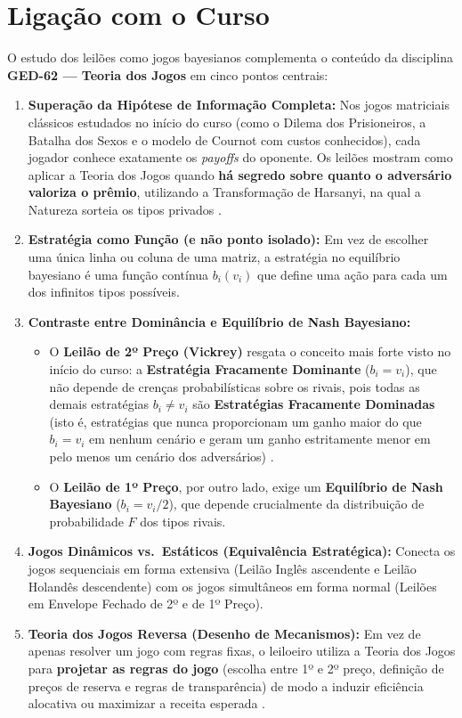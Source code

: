 \section{Ligação com o Curso}
\label{sec:ligacao_curso}

O estudo dos leilões como jogos bayesianos complementa o conteúdo da disciplina \textbf{GED-62 --- Teoria dos Jogos} em cinco pontos centrais:

\begin{enumerate}[label=\arabic*.]
    \item \textbf{Superação da Hipótese de Informação Completa:} Nos jogos matriciais clássicos estudados no início do curso (como o Dilema dos Prisioneiros, a Batalha dos Sexos e o modelo de Cournot com custos conhecidos), cada jogador conhece exatamente os \textit{payoffs} do oponente. Os leilões mostram como aplicar a Teoria dos Jogos quando \textbf{há segredo sobre quanto o adversário valoriza o prêmio}, utilizando a Transformação de Harsanyi, na qual a Natureza sorteia os tipos privados \cite{harsanyi1967,gibbons1992}.
    \item \textbf{Estratégia como Função (e não ponto isolado):} Em vez de escolher uma única linha ou coluna de uma matriz, a estratégia no equilíbrio bayesiano é uma função contínua $b_i(v_i)$ que define uma ação para cada um dos infinitos tipos possíveis.
    \item \textbf{Contraste entre Dominância e Equilíbrio de Nash Bayesiano:}
    \begin{itemize}
        \item O \textbf{Leilão de 2º Preço (Vickrey)} resgata o conceito mais forte visto no início do curso: a \textbf{Estratégia Fracamente Dominante} ($b_i = v_i$), que não depende de crenças probabilísticas sobre os rivais, pois todas as demais estratégias $b_i \neq v_i$ são \textbf{Estratégias Fracamente Dominadas} (isto é, estratégias que nunca proporcionam um ganho maior do que $b_i = v_i$ em nenhum cenário e geram um ganho estritamente menor em pelo menos um cenário dos adversários) \cite[p.~20]{vickrey1961}.
        \item O \textbf{Leilão de 1º Preço}, por outro lado, exige um \textbf{Equilíbrio de Nash Bayesiano} ($b_i = v_i/2$), que depende crucialmente da distribuição de probabilidade $F$ dos tipos rivais.
    \end{itemize}
    \item \textbf{Jogos Dinâmicos vs.\ Estáticos (Equivalência Estratégica):} Conecta os jogos sequenciais em forma extensiva (Leilão Inglês ascendente e Leilão Holandês descendente) com os jogos simultâneos em forma normal (Leilões em Envelope Fechado de 2º e de 1º Preço).
    \item \textbf{Teoria dos Jogos Reversa (Desenho de Mecanismos):} Em vez de apenas resolver um jogo com regras fixas, o leiloeiro utiliza a Teoria dos Jogos para \textbf{projetar as regras do jogo} (escolha entre 1º e 2º preço, definição de preços de reserva e regras de transparência) de modo a induzir eficiência alocativa ou maximizar a receita esperada \cite{myerson1981,klemperer2004}.
\end{enumerate}
